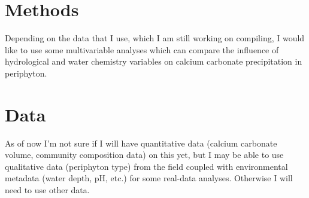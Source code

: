 \documentclass[
]{article}
\begin{document}
\hypertarget{methods}{%
\section{Methods}\label{methods}}

Depending on the data that I use, which I am still working on compiling,
I would like to use some multivariable analyses which can compare the
influence of hydrological and water chemistry variables on calcium
carbonate precipitation in periphyton.

\hypertarget{data}{%
\section{Data}\label{data}}

As of now I'm not sure if I will have quantitative data (calcium
carbonate volume, community composition data) on this yet, but I may be
able to use qualitative data (periphyton type) from the field coupled
with environmental metadata (water depth, pH, etc.) for some real-data
analyses. Otherwise I will need to use other data.
\end{document}
